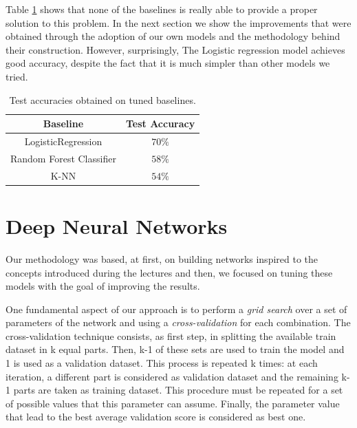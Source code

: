 \documentclass[10pt,conference,compsocconf]{IEEEtran}
\begin{document}
Table \ref{tab:baselineres} shows that none of the baselines is really able to provide a proper solution to this problem. In the next section we show the improvements that were obtained through the adoption of our own models and the methodology behind their construction. However, surprisingly, The Logistic regression model achieves good accuracy, despite the fact that it is much simpler than other models we tried.

\begin{table}[H]
\caption{Test accuracies obtained on tuned baselines.}
\label{tab:baselineres}
\centering
\begin{tabular}{ | c | c | }
\hline
Baseline & Test Accuracy \\
\hline
LogisticRegression & $70\%$ \\
\hline
Random Forest Classifier & $58\%$ \\
\hline
K-NN & $54\%$ \\
\hline
\end{tabular}
\end{table}

\section{Deep Neural Networks}
\label{sec:deep}
Our methodology was based, at first, on building networks inspired to the concepts introduced during the lectures and then, we focused on tuning these models with the goal of improving the results.

One fundamental aspect of our approach is to perform a \textit{grid search} over a set of parameters of the network and using a \textit{cross-validation} for each combination. The cross-validation technique consists, as first step, in splitting the available train dataset in k equal parts. Then, k-1 of these sets are used to train the model and 1 is used as a validation dataset. This process is repeated k times: at each iteration, a different part is considered as validation dataset and the remaining k-1 parts are taken as training dataset. This procedure must be repeated for a set of possible values that this parameter can assume. Finally, the parameter value that lead to the best average validation score is considered as best one.
\end{document}
